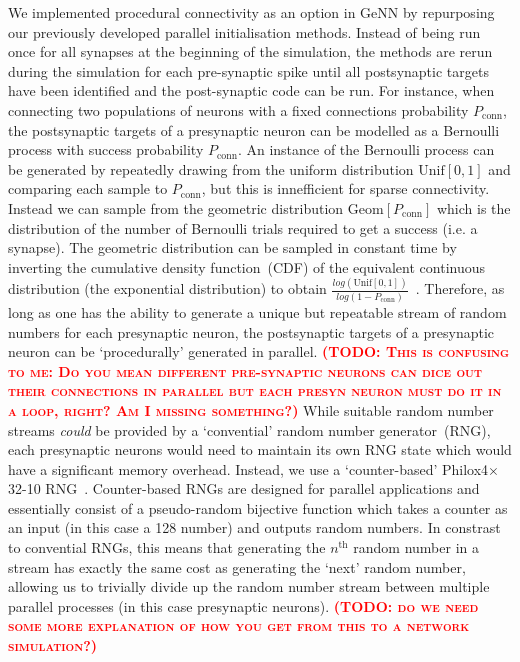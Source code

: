 \documentclass[9pt,twocolumn,twoside,lineno]{pnas-new}
\newcommand{\todo}[1]{\textbf{\textsc{\textcolor{red}{(TODO: #1)}}}}
\begin{document}
We implemented procedural connectivity as an option in GeNN by repurposing our previously developed parallel initialisation methods.
Instead of being run once for all synapses at the beginning of the simulation, the methods are rerun during the simulation for each pre-synaptic spike until all postsynaptic targets have been identified and the post-synaptic code can be run.
For instance, when connecting two populations of neurons with a fixed connections probability $P_{\text{conn}}$, the postsynaptic targets of a presynaptic neuron can be modelled as a Bernoulli process with success probability $P_{\text{conn}}$.
An instance of the Bernoulli process can be generated by repeatedly drawing from the uniform distribution $\text{Unif}[0, 1]$ and comparing each sample to $P_{\text{conn}}$, but this is innefficient for sparse connectivity.
Instead we can sample from the geometric distribution $\text{Geom}[P_{\text{conn}}]$ which is the distribution of the number of Bernoulli trials required to get a success (i.e. a synapse).
The geometric distribution can be sampled in constant time by inverting the cumulative density function~(CDF) of the equivalent continuous distribution (the exponential distribution) to obtain $\frac{log(\text{Unif}[0, 1])}{log(1 - P_{\text{conn}})}$~\citep[p499]{DevroyeLuc2013}.
Therefore, as long as one has the ability to generate a unique but repeatable stream of random numbers for each presynaptic neuron, the postsynaptic targets of a presynaptic neuron can be `procedurally' generated  in parallel. \todo{This is confusing to me: Do you mean different pre-synaptic neurons can dice out their connections in parallel but each presyn neuron must do it in a loop, right? Am I missing something?} 
While suitable random number streams \emph{could} be provided by a `convential' random number generator~(RNG), each presynaptic neurons would need to maintain its own RNG state which would have a significant memory overhead.
Instead, we use a `counter-based' Philox4$\times$32-10 RNG~\citep{Salmon2011}.
Counter-based RNGs are designed for parallel applications and essentially consist of a pseudo-random bijective function which takes a counter as an input (in this case a \SI{128}{\bit} number) and outputs random numbers.
In constrast to convential RNGs, this means that generating the $n^\text{th}$ random number in a stream has exactly the same cost as generating the `next' random number, allowing us to trivially divide up the random number stream between multiple parallel processes (in this case presynaptic neurons).
\todo{do we need some more explanation of how you get from this to a network simulation?}
\end{document}
